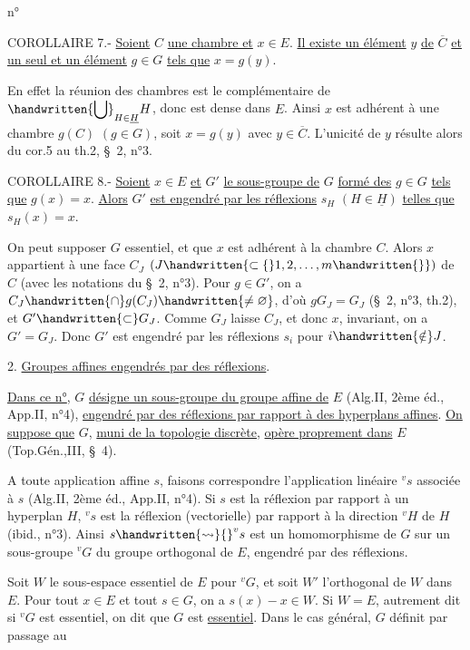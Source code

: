 \begin{flushright}n°\end{flushright}
COROLLAIRE 7.- \uline{Soient} $C$ \uline{une chambre et} $x\in E$. \uline{Il existe un élément} $y$ \uline{de} $\overline{C}$ \uline{et un seul et un élément} $g\in G$ \uline{tels que} $x=g(y)$.

En effet la réunion des chambres est le complémentaire de $\displaystyle\handwritten{\bigcup}_{H\in\underline{H}}H$, donc est dense dans $E$. Ainsi $x$ est adhérent à une chambre $g(C)$ $(g\in G)$, soit $x=g(y)$ avec $y\in\overline{C}$. L'unicité de $y$ résulte alors du cor.5 au th.2, \S\ 2, n°3.

COROLLAIRE 8.- \uline{Soient} $x\in E$ \uline{et} $G'$ \uline{le sous-groupe de} $G$ \uline{formé des} $g\in G$ \uline{tels que} $g(x)=x$. \uline{Alors} $G'$ \uline{est engendré par les réflexions} $s_H$ $(H\in\underline{H})$ \uline{telles que} $s_H(x)=x$.

On peut supposer $G$ essentiel, et que $x$ est adhérent à la chambre $C$. Alors $x$ appartient à une face $C_J$ $(J\handwritten{\subset\{}1,2,\ldots,m\handwritten{\}})$ de $C$ (avec les notations du \S\ 2, n°3). Pour $g\in G'$, on a $C_J\handwritten{\cap}g(C_J)\handwritten{\ne\varnothing}$, d'où $gG_J=G_J$ (\S\ 2, n°3, th.2), et $G'\handwritten{\subset}G_J$. Comme $G_J$ laisse $C_J$, et donc $x$, invariant, on a $G'=G_J$. Donc $G'$ est engendré par les réflexions $s_i$ pour $i\handwritten{\notin}J$.

2. \uline{Groupes affines engendrés par des réflexions}.

\uline{Dans ce n°}, $G$ \uline{désigne un sous-groupe du groupe affine de} $E$ (Alg.II, 2ème éd., App.II, n°4), \uline{engendré par des réflexions par rapport à des hyperplans affines}. \uline{On suppose que} $G$, \uline{muni de la topologie discrète}, \uline{opère proprement dans} $E$ (Top.Gén.,III, \S\ 4).

A toute application affine $s$, faisons correspondre l'application linéaire ${}^vs$ associée à $s$ (Alg.II, 2ème éd., App.II, n°4). Si $s$ est la réflexion par rapport à un hyperplan $H$, ${}^vs$ est la réflexion (vectorielle) par rapport à la direction ${}^vH$ de $H$ (ibid., n°3). Ainsi $s\handwritten{\rightsquigarrow}{}^vs$ est un homomorphisme de $G$ sur un sous-groupe ${}^vG$ du groupe orthogonal de $E$, engendré par des réflexions.

Soit $W$ le sous-espace essentiel de $E$ pour ${}^vG$, et soit $W'$ l'orthogonal de $W$ dans $E$. Pour tout $x\in E$ et tout $s\in G$, on a $s(x)-x\in W$. Si $W=E$, autrement dit si ${}^vG$ est essentiel, on dit que $G$ est \uline{essentiel}. Dans le cas général, $G$ définit par passage au
